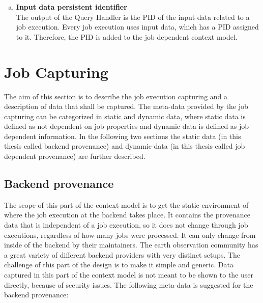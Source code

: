 \documentclass[draft,final]{vutinfth} %
\begin{document}
\begin{enumerate}[(a)]
\item \textbf{Input data persistent identifier} \\
	The output of the Query Handler is the PID of the input data related to a job execution. Every job execution uses input data, which has a PID assigned to it. Therefore, the PID is added to the job dependent context model. 
\end{enumerate}

\section{Job Capturing}\label{Design:Job Capturing}
The aim of this section is to describe the job execution capturing and a description of data that shall be captured. The meta-data provided by the job capturing can be categorized in static and dynamic data, where static data is defined as not dependent on job properties and dynamic data is defined as job dependent information. In the following two sections the static data (in this thesis called backend provenance) and dynamic data (in this thesis called job dependent provenance) are further described.     

\subsection{Backend provenance}\label{Design:Backend provenance}
The scope of this part of the context model is to get the static environment of where the job execution at the backend takes place. It contains the provenance data that is independent of a job execution, so it does not change through job executions, regardless of how many jobs were processed. It can only change from inside of the backend by their maintainers. The earth observation community has a great variety of different backend providers with very distinct setups. The challenge of this part of the design is to make it simple and generic. Data captured in this part of the context model is not meant to be shown to the user directly, because of security issues. The following meta-data is suggested for the backend provenance:
\end{document}
